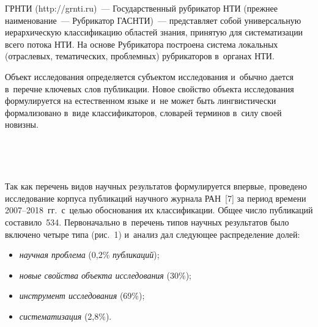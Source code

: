 \begin{multicols}{2}
     
    ГРНТИ ({\sf http://grnti.ru})~--- Государственный руб\-ри\-ка\-тор  
НТИ (прежнее наименование~--- 
Рубрикатор ГАСНТИ)~--- представляет собой универсальную иерархическую 
классификацию областей знания, принятую для систематизации всего потока 
НТИ. На основе Рубрикатора построена сис\-те\-ма 
локальных (отраслевых, тематических, проблемных) руб\-ри\-ка\-то\-ров в~органах  
НТИ.
    
    Объект исследования определяется субъектом исследования и~обычно 
дается в~перечне ключевых слов публикации. Новое свойство объекта 
исследования формулируется на естественном языке и~не может быть 
лингвистически формализовано в~виде классификаторов, словарей терминов в~силу своей новизны.

\begin{figure*} %
\vspace*{1pt}
    \begin{center}  
  \mbox{%
 \epsfxsize=121.143mm 
 }
\end{center}
\vspace*{-9pt}
\end{figure*}
\begin{figure*}[b] %
\vspace*{1pt}
    \begin{center}  
  \mbox{%
 \epsfxsize=121.089mm 
 }
\end{center}
\vspace*{-9pt}
\end{figure*}

    
    Так как перечень видов научных результатов формулируется впервые, 
проведено исследование корпуса публикаций научного журнала РАН~[7] за 
период времени 2007--2018~гг.\ с~целью обоснования их классификации. 
Общее число публикаций составило~534. Первоначально в~перечень типов 
научных результатов было включено четыре типа (рис.~1) и~анализ дал 
следующее распределение долей:
     \begin{itemize}
    \item 
\textit{научная проблема} (0,2\% \textit{публикаций});
    \item 
\textit{новые свойства объекта исследования} (30\%);
    \item 
\textit{инструмент исследования} (69\%);
     \item \textit{систематизация} (2,8\%).
     \end{itemize}


\end{multicols}
